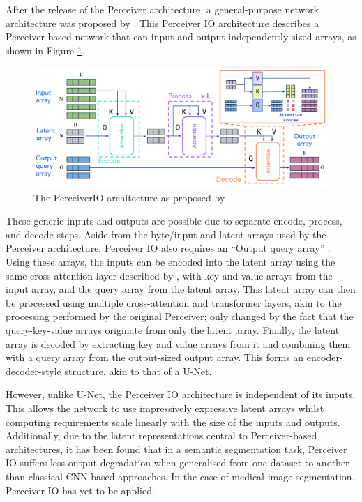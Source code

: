 \documentclass{l4proj}
\begin{document}
After the release of the Perceiver architecture, a general-purpose network architecture was proposed by \cite{perceiverio}. This Perceiver IO architecture describes a Perceiver-based network that can input and output independently sized-arrays, as shown in Figure \ref{fig:perceiverio}.

\begin{figure}[htb]
    \centering
    \includegraphics[width=0.75\linewidth]{images/perceiverio_architecture.png}  

    \caption{The PerceiverIO architecture as proposed by \cite{perceiverio}}

    \label{fig:perceiverio} 
\end{figure}

These generic inputs and outputs are possible due to separate encode, process, and decode steps. Aside from the byte/input and latent arrays used by the Perceiver architecture, Perceiver IO also requires an “Output query array” \citep{perceiverio}. Using these arrays, the inputs can be encoded into the latent array using the same cross-attention layer described by \cite{perceiver}, with key and value arrays from the input array, and the query array from the latent array. This latent array can then be processed using multiple cross-attention and transformer layers, akin to the processing performed by the original Perceiver; only changed by the fact that the query-key-value arrays originate from only the latent array. Finally, the latent array is decoded by extracting key and value arrays from it and combining them with a query array from the output-sized output array. This forms an encoder-decoder-style structure, akin to that of a U-Net.

However, unlike U-Net, the Perceiver IO architecture is independent of its inputs. This allows the network to use impressively expressive latent arrays whilst computing requirements scale linearly with the size of the inputs and outputs. Additionally, due to the latent representations central to Perceiver-based architectures, it has been found that in a semantic segmentation task, Perceiver IO suffers less output degradation when generalised from one dataset to another \citep{choi2022semantic, tan2022temporal} than classical CNN-based approaches. In the case of medical image segmentation, Perceiver IO has yet to be applied.
\end{document}
